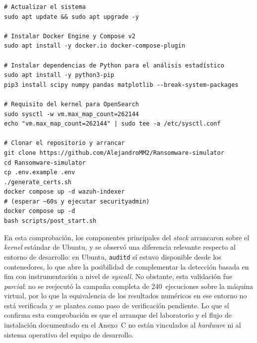 \documentclass[../main.tex]{subfiles}
\begin{document}
\begin{lstlisting}[style=bash, caption={Instalación mínima en Ubuntu 24.04 para
  reproducir el laboratorio desde cero.}, label={lst:vm-setup}]
# Actualizar el sistema
sudo apt update && sudo apt upgrade -y

# Instalar Docker Engine y Compose v2
sudo apt install -y docker.io docker-compose-plugin

# Instalar dependencias de Python para el análisis estadístico
sudo apt install -y python3-pip
pip3 install scipy numpy pandas matplotlib --break-system-packages

# Requisito del kernel para OpenSearch
sudo sysctl -w vm.max_map_count=262144
echo "vm.max_map_count=262144" | sudo tee -a /etc/sysctl.conf

# Clonar el repositorio y arrancar
git clone https://github.com/AlejandroMM2/Ransomware-simulator
cd Ransomware-simulator
cp .env.example .env
./generate_certs.sh
docker compose up -d wazuh-indexer
# (esperar ~60s y ejecutar securityadmin)
docker compose up -d
bash scripts/post_start.sh
\end{lstlisting}

En esta comprobación, los componentes principales del \emph{stack} arrancaron sobre
el \emph{kernel} estándar de Ubuntu, y se observó una diferencia relevante respecto
al entorno de desarrollo: en Ubuntu, \texttt{auditd} sí estuvo disponible desde los
contenedores, lo que abre la posibilidad de complementar la detección basada en
\gls{fim} con instrumentación a nivel de \emph{syscall}. No obstante, esta
validación fue \emph{parcial}: no se reejecutó la campaña completa de 240~ejecuciones
sobre la máquina virtual, por lo que la equivalencia de los resultados numéricos en
ese entorno no está verificada y se plantea como paso de verificación pendiente. Lo
que sí confirma esta comprobación es que el arranque del laboratorio y el flujo de
instalación documentado en el Anexo~C no están vinculados al \emph{hardware} ni al
sistema operativo del equipo de desarrollo.
\end{document}
